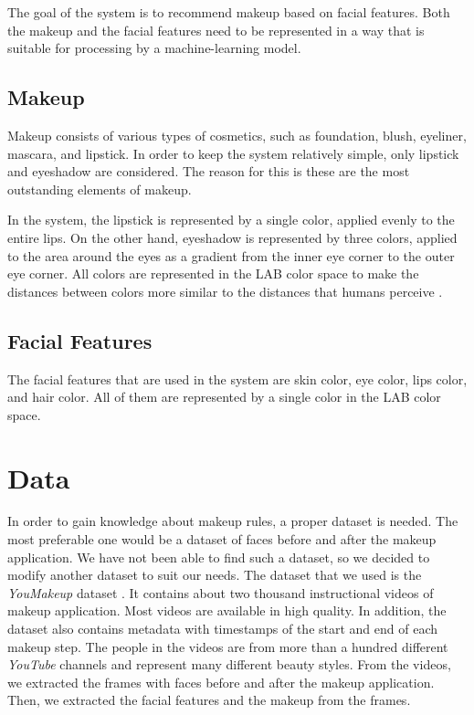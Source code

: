 \documentclass[conference]{IEEEtran}
\begin{document}
The goal of the system is to recommend makeup based on facial features.
Both the makeup and the facial features need to be represented in a way that is suitable for processing by a machine-learning model.

\subsection{Makeup}

Makeup consists of various types of cosmetics, such as foundation, blush, eyeliner, mascara, and lipstick.
In order to keep the system relatively simple, only lipstick and eyeshadow are considered.
The reason for this is these are the most outstanding elements of makeup.

In the system, the lipstick is represented by a single color, applied evenly to the entire lips.
On the other hand, eyeshadow is represented by three colors, applied to the area around the eyes as a gradient from the inner eye corner to the outer eye corner.
All colors are represented in the LAB color space to make the distances between colors more similar to the distances that humans perceive \cite{tkalcic2003colorspaces}.

\subsection{Facial Features}

The facial features that are used in the system are skin color, eye color, lips color, and hair color.
All of them are represented by a single color in the LAB color space.

\section{Data} \label{sec:data}

In order to gain knowledge about makeup rules, a proper dataset is needed.
The most preferable one would be a dataset of faces before and after the makeup application.
We have not been able to find such a dataset, so we decided to modify another dataset to suit our needs.
The dataset that we used is the \emph{YouMakeup} dataset \cite{wang2019youmakeup}.
It contains about two thousand instructional videos of makeup application.
Most videos are available in high quality.
In addition, the dataset also contains metadata with timestamps of the start and end of each makeup step.
The people in the videos are from more than a hundred different \emph{YouTube} channels and represent many different beauty styles.
From the videos, we extracted the frames with faces before and after the makeup application.
Then, we extracted the facial features and the makeup from the frames.
\end{document}
